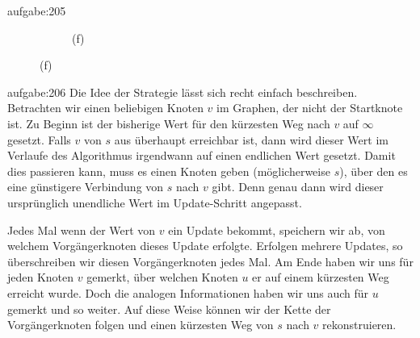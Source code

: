 \begin{antwort}{aufgabe:205}
\begin{figure}[H]
\begin{subfigure}[b]{0.4\textwidth}
{
}%
\caption*{(f)}
\end{subfigure}
\end{figure}
\end{antwort}


\begin{antwort}{aufgabe:206}
Die Idee der Strategie lässt sich recht einfach beschreiben. Betrachten wir einen beliebigen Knoten $v$ im Graphen, der nicht der Startknote ist. Zu Beginn ist der bisherige Wert für den kürzesten Weg nach $v$ auf $\infty$ gesetzt. Falls $v$ von $s$ aus überhaupt erreichbar ist, dann wird dieser Wert im Verlaufe des Algorithmus irgendwann auf einen endlichen Wert gesetzt. Damit dies passieren kann, muss es einen Knoten geben (möglicherweise $s$), über den es eine günstigere Verbindung von $s$ nach $v$ gibt. Denn genau dann wird dieser ursprünglich unendliche Wert im Update-Schritt angepasst. 

Jedes Mal wenn der Wert von $v$ ein Update bekommt, speichern wir ab, von welchem Vorgängerknoten dieses Update erfolgte. Erfolgen mehrere Updates, so überschreiben wir diesen Vorgängerknoten jedes Mal. Am Ende haben wir uns für jeden Knoten $v$ gemerkt, über welchen Knoten $u$ er auf einem kürzesten Weg erreicht wurde. Doch die analogen Informationen haben wir uns auch für $u$ gemerkt und so weiter. Auf diese Weise können wir der Kette der Vorgängerknoten folgen und einen kürzesten Weg von $s$ nach $v$ rekonstruieren.
\end{antwort}


